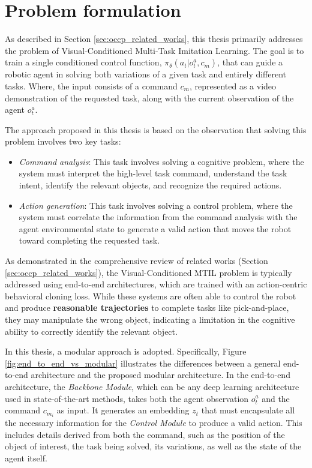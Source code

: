 \section{Problem formulation}
\label{sec:ocpl_problem}
As described in Section \ref{sec:occp_related_works}, this thesis primarily addresses the problem of Visual-Conditioned Multi-Task Imitation Learning. The goal is to train a single conditioned control function, $\pi_{\theta}(a_{t}| o^{a}_{t}, c_m)$, that can guide a robotic agent in solving both variations of a given task and entirely different tasks. Where, the input consists of a command $c_m$, represented as a video demonstration of the requested task, along with the current observation of the agent $o^{a}_{t}$.

The approach proposed in this thesis is based on the observation that solving this problem involves two key tasks:
\begin{itemize}
    \item \textit{Command analysis}: This task involves solving a cognitive problem, where the system must interpret the high-level task command, understand the task intent, identify the relevant objects, and recognize the required actions.
    \item \textit{Action generation}: This task involves solving a control problem, where the system must correlate the information from the command analysis with the agent environmental state to generate a valid action that moves the robot toward completing the requested task.
\end{itemize}

As demonstrated in the comprehensive review of related works (Section \ref{sec:occp_related_works}), the Visual-Conditioned MTIL problem is typically addressed using end-to-end architectures, which are trained with an action-centric behavioral cloning loss. While these systems are often able to control the robot and produce \textbf{reasonable trajectories} to complete tasks like pick-and-place, they may manipulate the wrong object, indicating a limitation in the cognitive ability to correctly identify the relevant object.


In this thesis, a modular approach is adopted. Specifically, Figure \ref{fig:end_to_end_vs_modular} illustrates the differences between a general end-to-end architecture and the proposed modular architecture. In the end-to-end architecture, the \textit{Backbone Module}, which can be any deep learning architecture used in state-of-the-art methods, takes both the agent observation $o^{a}_t$ and the command $c_{m_i}$ as input. It generates an embedding $z_t$ that must encapsulate all the necessary information for the \textit{Control Module} to produce a valid action. This includes details derived from both the command, such as the position of the object of interest, the task being solved, its variations, as well as the state of the agent itself.

